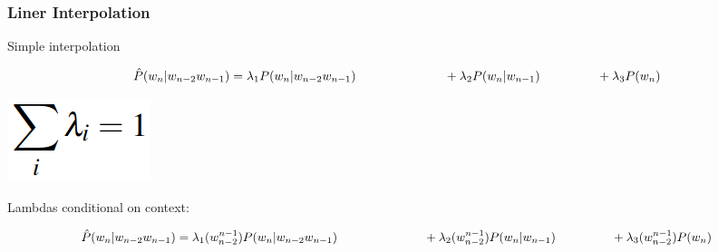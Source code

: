 \documentclass[13.5pt,aspecratio=169]{beamer}
\begin{document}

\begin{frame}
    \onehalfspacing
        \frametitle{Liner Interpolation}
        {\Large Simple interpolation}
        \begin{minipage}{0.65\textwidth}
        \begin{center} 
            \[ \hat{P}(w_n | w_{n-2} w_{n-1}) = \lambda_1 P(w_n | w_{n-2} w_{n-1}) \\ \vspace{-1em}
                                                \hspace{7em} + \lambda_2 P(w_n | w_{n-1}) \\ 
                                                \hspace{4.5em} + \lambda_3 P(w_n) \]
          \end{center}
        \end{minipage}
        \hspace{10}
        \begin{minipage}{0.3\textwidth}
            \vspace{2em}
            \centering
            \includegraphics[scale=0.5]{sum_all_lambdas.png}
        \end{minipage}

        \vspace{3em}
        {\Large Lambdas conditional on context:}
        \begin{minipage}{0.75\textwidth}
        \begin{center} 
            \[ \hat{P}(w_n | w_{n-2} w_{n-1}) = \lambda_1 (w^{n-1}_{n-2}) P(w_n | w_{n-2} w_{n-1}) \\ \vspace{-0.5em}
                                                \hspace{7em} + \lambda_2 (w^{n-1}_{n-2}) P(w_n | w_{n-1}) \\ \vspace{0.5em}
                                                \hspace{4.5em} + \lambda_3 (w^{n-1}_{n-2}) P(w_n) \]
          \end{center}
        \end{minipage}
    
       
\end{frame}
    
\end{document}
